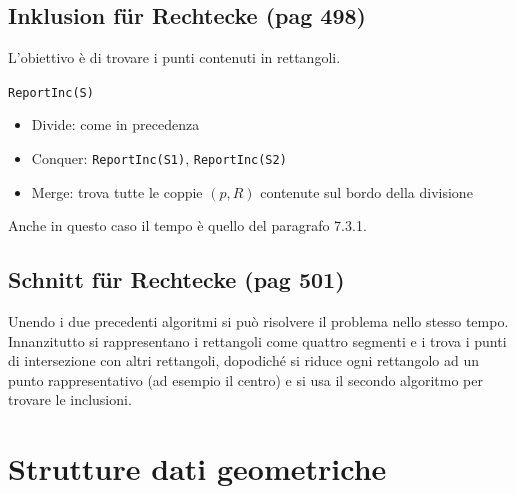 \documentclass[a4paper]{book}
\newcommand{\inline}[1]{\lstinline!#1!}%
\begin{document}
\subsection{Inklusion für Rechtecke (pag 498)}
L'obiettivo è di trovare i punti contenuti in rettangoli.

\inline{ReportInc(S)}
\begin{itemize}
\item Divide: come in precedenza
\item Conquer: \inline{ReportInc(S1)}, \inline{ReportInc(S2)}
\item Merge: trova tutte le coppie $(p,R)$ contenute sul bordo della divisione
\end{itemize}
Anche in questo caso il tempo è quello del paragrafo 7.3.1.
\subsection{Schnitt für Rechtecke (pag 501)}
Unendo i due precedenti algoritmi si può risolvere il problema nello stesso tempo. Innanzitutto si rappresentano i rettangoli come quattro segmenti e i trova i punti di intersezione con altri rettangoli, dopodiché si riduce ogni rettangolo ad un punto rappresentativo (ad esempio il centro) e si usa il secondo algoritmo per trovare le inclusioni.

\section{Strutture dati geometriche}
\end{document}
